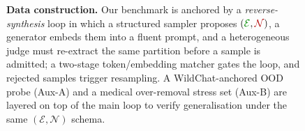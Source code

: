 \begin{figure}[t]
\begin{tikzpicture}
\end{tikzpicture}

\caption{\textbf{Data construction.} Our benchmark is anchored by a
\emph{reverse-synthesis} loop in which a structured sampler proposes
$(\textcolor{\colE}{\mathcal{E}},\textcolor{\colN}{\mathcal{N}})$, a
generator embeds them into a fluent prompt, and a heterogeneous judge
must re-extract the same partition before a sample is admitted; a
two-stage token/embedding matcher gates the loop, and rejected samples
trigger resampling. A WildChat-anchored OOD probe (Aux-A) and a
medical over-removal stress set (Aux-B) are layered on top of the
main loop to verify generalisation under the same
$(\mathcal{E},\mathcal{N})$ schema.}
\label{fig:data}
\end{figure}
